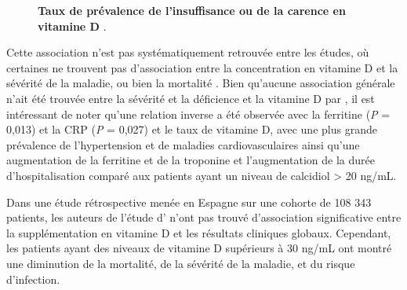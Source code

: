 \documentclass[
  a4paper,
  DIV=11,
  numbers=noendperiod,
  listof=totoc]{scrreprt}
\begin{document}
\begin{figure}


\caption[Taux de prévalence de l'insuffisance ou de la carence en
vitamine D.]{\label{fig-vd-covid-deficiency}\textbf{Taux de prévalence
de l'insuffisance ou de la carence en vitamine D}
\autocite{Campi.2021}.}

\end{figure}%

Cette association n'est pas systématiquement retrouvée entre les études,
où certaines ne trouvent pas d'association entre la concentration en
vitamine D et la sévérité de la maladie, ou bien la mortalité
\autocite{Hernández.2020,Jevalikar.2021,Cereda.2021,Murai.2021}. Bien
qu'aucune association générale n'ait été trouvée entre la sévérité et la
déficience et la vitamine D par \textcite{Hernández.2020}, il est
intéressant de noter qu'une relation inverse a été observée avec la
ferritine (\emph{P} = 0,013) et la CRP (\emph{P} = 0,027) et le taux de
vitamine D, avec une plus grande prévalence de l'hypertension et de
maladies cardiovasculaires ainsi qu'une augmentation de la ferritine et
de la troponine et l'augmentation de la durée d'hospitalisation comparé
aux patients ayant un niveau de calcidiol \textgreater{} 20 ng/mL.

Dans une étude rétrospective menée en Espagne sur une cohorte de 108 343
patients, les auteurs de l'étude d'\textcite{Oristrell.2022} n'ont pas
trouvé d'association significative entre la supplémentation en vitamine
D et les résultats cliniques globaux. Cependant, les patients ayant des
niveaux de vitamine D supérieurs à 30 ng/mL ont montré une diminution de
la mortalité, de la sévérité de la maladie, et du risque d'infection.
\end{document}
